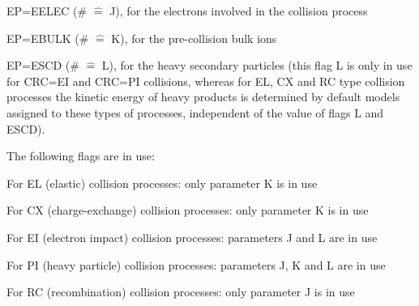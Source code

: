 EP=EELEC (\# $ \hat{=} $ J), for the electrons involved in the collision
process

EP=EBULK (\# $ \hat{=} $ K), for the pre-collision bulk ions

EP=ESCD  (\# $ \hat{=} $ L), for the heavy secondary particles (this flag L  is
only in use for CRC=EI and CRC=PI collisions, whereas for EL, CX and RC type
collision processes the kinetic energy of heavy products is determined by
default models assigned to these types of processes, independent of the value
of flags L and ESCD).

The following flags are in use:

For EL (elastic) collision processes:  only parameter K is in use

For CX (charge-exchange) collision processes:	 only parameter K is in use

For EI (electron impact) collision processes:	 parameters J and L are in use

For PI (heavy particle) collision  processes:	 parameters J, K and L are in
use

For RC (recombination)	collision processes:	 only parameter J is in use

